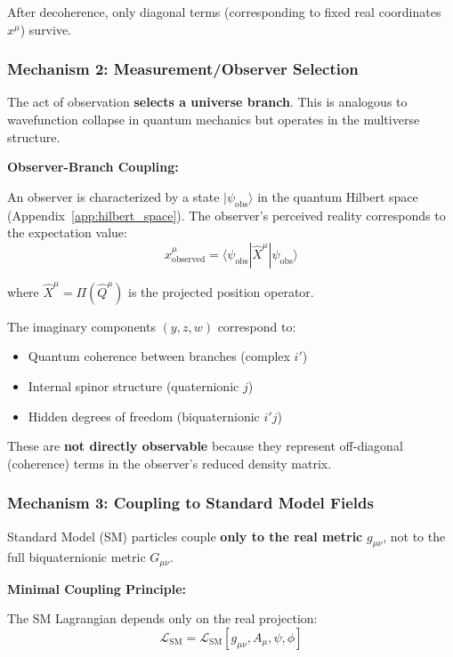 After decoherence, only diagonal terms (corresponding to fixed real coordinates $x^{\mu}$) survive.

\subsubsection{Mechanism 2: Measurement/Observer Selection}

The act of observation \textbf{selects a universe branch}. This is analogous to wavefunction collapse in quantum mechanics but operates in the multiverse structure.

\textbf{Observer-Branch Coupling:}

An observer is characterized by a state $|\psi_{\text{obs}}\rangle$ in the quantum Hilbert space (Appendix~\ref{app:hilbert_space}). The observer's perceived reality corresponds to the expectation value:
\begin{equation}
x^{\mu}_{\text{observed}} = \langle \psi_{\text{obs}} | \hat{X}^{\mu} | \psi_{\text{obs}} \rangle
\end{equation}

where $\hat{X}^{\mu} = \Pi(\hat{Q}^{\mu})$ is the projected position operator.

The imaginary components $(y, z, w)$ correspond to:
\begin{itemize}
\item Quantum coherence between branches (complex $i'$)
\item Internal spinor structure (quaternionic $j$)
\item Hidden degrees of freedom (biquaternionic $i'j$)
\end{itemize}

These are \textbf{not directly observable} because they represent off-diagonal (coherence) terms in the observer's reduced density matrix.

\subsubsection{Mechanism 3: Coupling to Standard Model Fields}

Standard Model (SM) particles couple \textbf{only to the real metric} $g_{\mu\nu}$, not to the full biquaternionic metric $G_{\mu\nu}$.

\textbf{Minimal Coupling Principle:}

The SM Lagrangian depends only on the real projection:
\begin{equation}
\mathcal{L}_{\text{SM}} = \mathcal{L}_{\text{SM}}[g_{\mu\nu}, A_{\mu}, \psi, \phi]
\end{equation}

